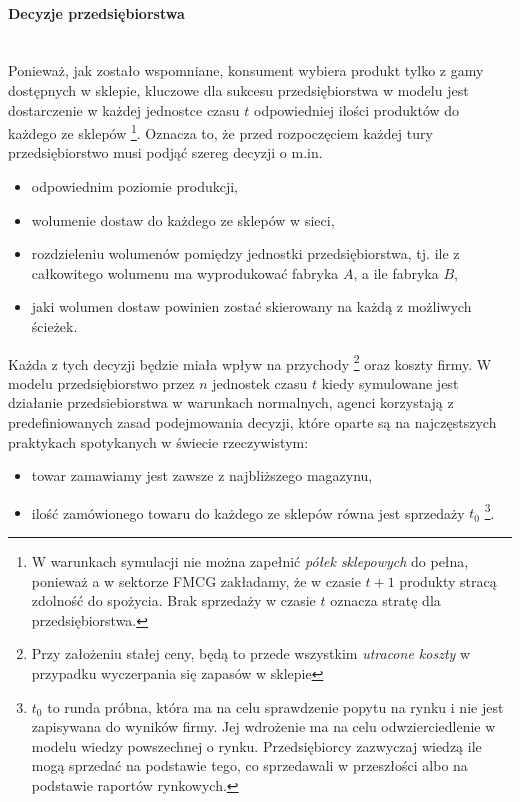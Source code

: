 \documentclass[polish, twoside, 12pt, a4paper]{article}
\theoremstyle{definition}
\theoremstyle{plain}
\theoremstyle{remark}
\begin{document}
\paragraph{Decyzje przedsiębiorstwa}\mbox{}\\

Ponieważ, jak zostało wspomniane, konsument wybiera produkt tylko z gamy dostępnych w sklepie, kluczowe dla sukcesu przedsiębiorstwa w modelu jest dostarczenie w każdej jednostce czasu $t$ odpowiedniej ilości produktów do każdego ze sklepów \footnote{W warunkach symulacji nie można zapełnić \textit{półek sklepowych} do pełna, ponieważ a w sektorze FMCG zakładamy, że w czasie $t+1$ produkty stracą zdolność do spożycia. Brak sprzedaży w czasie $t$ oznacza stratę dla przedsiębiorstwa.}. Oznacza to, że przed rozpoczęciem każdej tury przedsiębiorstwo musi podjąć szereg decyzji o m.in.

	\begin{itemize}
		\item odpowiednim poziomie produkcji,
		\item wolumenie dostaw do każdego ze sklepów w sieci,
		\item rozdzieleniu wolumenów pomiędzy jednostki przedsiębiorstwa, tj. ile z całkowitego wolumenu ma wyprodukować fabryka $A$, a ile fabryka $B$,
	 	\item jaki wolumen dostaw powinien zostać skierowany na każdą z możliwych ścieżek.
\end{itemize}

Każda z tych decyzji będzie miała wpływ na przychody \footnote{Przy założeniu stałej ceny, będą to przede wszystkim \textit{utracone koszty} w przypadku wyczerpania się zapasów w sklepie} oraz koszty firmy. W modelu przedsiębiorstwo przez $n$ jednostek czasu $t$ kiedy symulowane jest działanie przedsiebiorstwa w warunkach normalnych, agenci korzystają z predefiniowanych zasad podejmowania decyzji, które oparte są na najczęstszych praktykach spotykanych w świecie rzeczywistym: 

	\begin{itemize}
		\item towar zamawiamy jest zawsze z najbliższego magazynu,
		\item ilość zamówionego towaru do każdego ze sklepów równa jest sprzedaży $t_0$ \footnote{$t_0$ to runda próbna, która ma na celu sprawdzenie popytu na rynku i nie jest zapisywana do wyników firmy. Jej wdrożenie ma na celu odwzierciedlenie w modelu wiedzy powszechnej o rynku. Przedsiębiorcy zazwyczaj wiedzą ile mogą sprzedać na podstawie tego, co sprzedawali w przeszłości albo na podstawie raportów rynkowych.}.
	\end{itemize}
\end{document}
